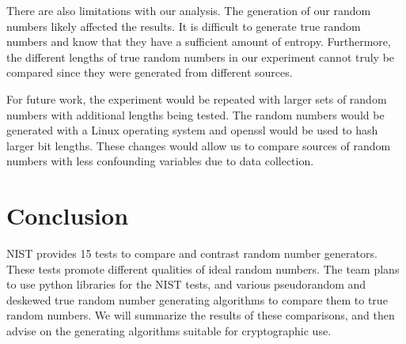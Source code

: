 \documentclass[11pt,letterpaper,conference]{IEEEtran}
\begin{document}
There are also limitations with our analysis. The generation of our random numbers likely affected the
results. It is difficult to generate true random numbers and know that they have a sufficient amount
of entropy. Furthermore, the different lengths of true random numbers in our experiment cannot truly
be compared since they were generated from different sources.

For future work, the experiment would be repeated with larger sets of random numbers with additional
lengths being tested. The random numbers would be generated with a Linux operating system and openssl
would be used to hash larger bit lengths. These changes would allow us to compare sources of random
numbers with less confounding variables due to data collection. 


\section{Conclusion}
NIST provides 15 tests to compare and contrast random number generators. These tests promote different
qualities of ideal random numbers. The team plans to use python libraries for the NIST tests, and
various pseudorandom and deskewed true random number generating algorithms to compare them to true
random numbers. We will summarize the results of these comparisons, and then advise on the generating
algorithms suitable for cryptographic use.

\printbibliography[heading=bibintoc, title={References}]
\end{document}
